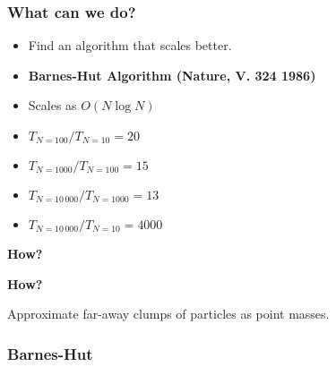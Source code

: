 \begin{frame}
  \frametitle{What can we do?}
  \begin{itemize}
    \item Find an algorithm that scales better.
    \item \textbf{Barnes-Hut Algorithm (Nature, V. 324 1986)}
    \item Scales as \( O(N \log N) \)
  \end{itemize}
  \begin{itemize}
    \item \( T_{N=100} / T_{N=10} = 20 \)
    \item \( T_{N=1000} / T_{N=100} = 15 \)
    \item \( T_{N=10\,000} / T_{N=1000} = 13 \)
    \item \( T_{N=10\,000} / T_{N=10} = 4000 \)
  \end{itemize}
\end{frame}

\begin{frame}
  \centering
  {\Large\textbf{How?}}
\end{frame}


\begin{frame}
  \centering
  {\Large\textbf{How?}}

  \vspace*{5mm}
    Approximate far-away clumps of particles as point masses.
\end{frame}

\begin{frame}
  \frametitle{Barnes-Hut}
    \centering
\end{frame}

